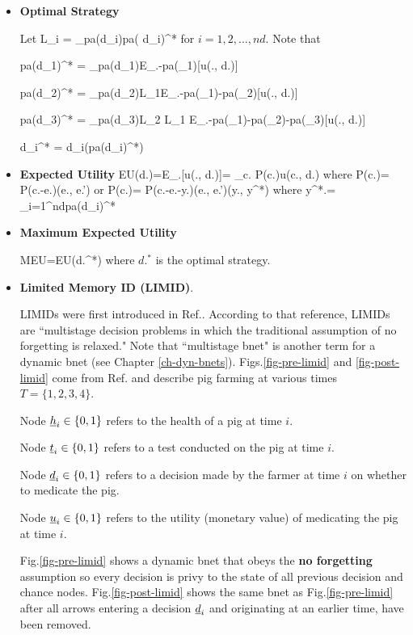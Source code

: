 \begin{itemize}


\item{\bf Optimal Strategy}

Let
\beq
L_i = \lim_{pa(d_i)\rarrow pa( d_i)^*}
\eeq
for $i=1,2, \ldots, nd$.
Note that



\beq
pa(d_1)^* = \argmax_{pa(d_1)}E_{\rvc.-pa(\rvd_1)}[u(\rvc., d.)]
\eeq


\beq 
pa(d_2)^* = \argmax_{pa(d_2)}L_1E_{\rvc.-pa(\rvd_1)-pa(\rvd_2)}[u(\rvc., d.)]
\eeq

\beq 
pa(d_3)^* = \argmax_{pa(d_3)}L_2 L_1 E_{\rvc.-pa(\rvd_1)-pa(\rvd_2)-pa(\rvd_3)}[u(\rvc., d.)]
\eeq

\beq
d_i^* = d_i(pa(d_i)^*)
\eeq


\item {\bf Expected Utility}
\beq
EU(d.)=E_{\rvc.}[u(\rvc., d.)]=
\sum_{c.} P(c.)u(c., d.)
\eeq
where 
\beq
P(c.)= P(c.-e.)\delta(e., e.')
\eeq
or
\beq
P(c.)= P(c.-e.-y.)\delta(e., e.')\delta(y., y^*)
\eeq
where 
\beq 
y^*.= \cup_{i=1}^{nd}pa(d_i)^*
\eeq


\item {\bf Maximum Expected Utility}

\beq
MEU=EU(d.^*)
\eeq
where $d.^*$ is the optimal strategy.


\item {\bf Limited Memory ID (LIMID)}. 

LIMIDs were first introduced 
in Ref.\cite{limid-one}. According to that reference, LIMIDs are ``multistage decision problems in which the traditional assumption of no forgetting is
relaxed." 
Note that ``multistage bnet" is another term
for a dynamic bnet (see Chapter \ref{ch-dyn-bnets}).
Figs.\ref{fig-pre-limid} and \ref{fig-post-limid}
come from Ref.\cite{limid-one} and describe pig farming
at various times $T=\{1,2,3,4\}$.

Node ${\underline{h}}_i\in\{0,1\}$
refers to the health of a pig at time $i$.

Node ${\underline{t}}_i\in \{0,1\}$ refers to a test 
conducted on the pig at time $i$.

Node ${\underline{d}}_i\in \{0,1\}$ refers to a decision 
made by the farmer at time $i$ on whether to medicate the pig.

Node ${\underline{u}}_i\in \{0,1\}$ refers to the utility (monetary value)  
of medicating the pig at time $i$.

 
Fig.\ref{fig-pre-limid} shows a dynamic bnet that
obeys the {\bf no forgetting} assumption so every decision is
privy to the state of all previous decision and chance nodes.
Fig.\ref{fig-post-limid} shows the same bnet as 
Fig.\ref{fig-pre-limid} after all arrows entering a decision ${\underline{d}}_i$ and originating at an earlier time, have been removed.




\end{itemize}
